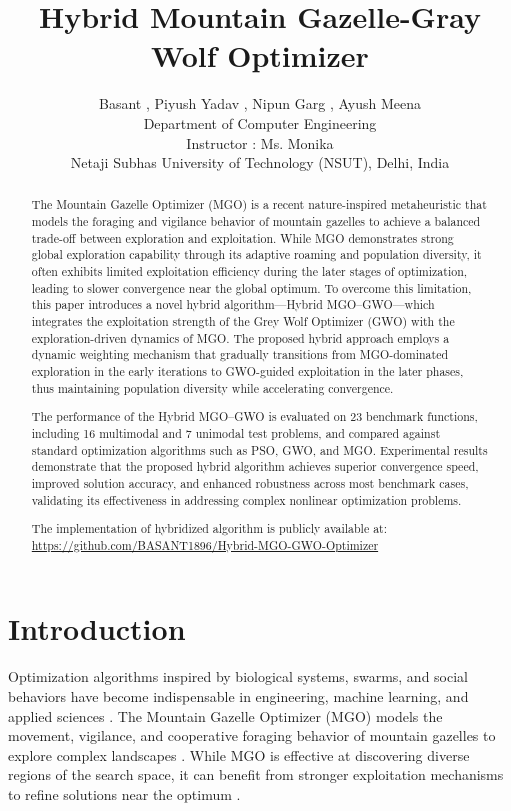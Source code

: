 \documentclass[12pt,a4paper]{article}
\title{\textbf{Hybrid Mountain Gazelle-Gray Wolf Optimizer}}
\author{
Basant , Piyush Yadav , Nipun Garg , Ayush Meena\\[6pt]
\small Department of Computer Engineering\\
\small Instructor : Ms. Monika\\
\small Netaji Subhas University of Technology (NSUT), Delhi, India
}
\date{}
\begin{document}
\maketitle

\begin{abstract}
The Mountain Gazelle Optimizer (MGO) is a recent nature-inspired metaheuristic that models the foraging and vigilance behavior of mountain gazelles to achieve a balanced trade-off between exploration and exploitation. While MGO demonstrates strong global exploration capability through its adaptive roaming and population diversity, it often exhibits limited exploitation efficiency during the later stages of optimization, leading to slower convergence near the global optimum. To overcome this limitation, this paper introduces a novel hybrid algorithm—Hybrid MGO–GWO—which integrates the exploitation strength of the Grey Wolf Optimizer (GWO) with the exploration-driven dynamics of MGO. The proposed hybrid approach employs a dynamic weighting mechanism that gradually transitions from MGO-dominated exploration in the early iterations to GWO-guided exploitation in the later phases, thus maintaining population diversity while accelerating convergence. 


The performance of the Hybrid MGO–GWO is evaluated on 23 benchmark functions, including 16 multimodal and 7 unimodal test problems, and compared against standard optimization algorithms such as PSO, GWO, and MGO. Experimental results demonstrate that the proposed hybrid algorithm achieves superior convergence speed, improved solution accuracy, and enhanced robustness across most benchmark cases, validating its effectiveness in addressing complex nonlinear optimization problems.

The implementation of hybridized algorithm is publicly available at:
\url{https://github.com/BASANT1896/Hybrid-MGO-GWO-Optimizer}


\end{abstract}


\section{Introduction}
Optimization algorithms inspired by biological systems, swarms, and social behaviors have become indispensable in engineering, machine learning, and applied sciences \cite{metaheuristics, abdollahzadeh2021a, derrac2011, wolpert1997}. The Mountain Gazelle Optimizer (MGO) models the movement, vigilance, and cooperative foraging behavior of mountain gazelles to explore complex landscapes \cite{mgo}. While MGO is effective at discovering diverse regions of the search space, it can benefit from stronger exploitation mechanisms to refine solutions near the optimum \cite{benchmark, wilcoxon}.
\end{document}
